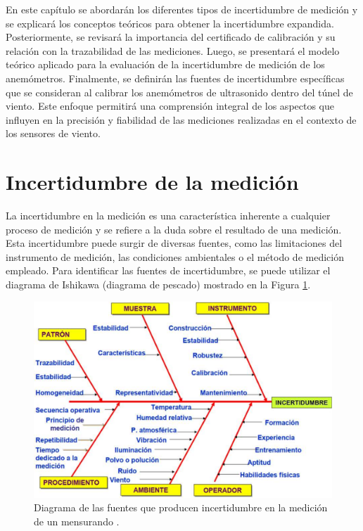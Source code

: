 En este capítulo se abordarán los diferentes tipos de incertidumbre de medición y se explicará los conceptos teóricos para obtener la incertidumbre expandida. Posteriormente, se revisará la importancia del certificado de calibración y su relación con la trazabilidad de las mediciones. Luego, se presentará el modelo teórico aplicado para la evaluación de la incertidumbre de medición de los anemómetros. Finalmente, se definirán las fuentes de incertidumbre específicas que se consideran al calibrar los anemómetros de ultrasonido dentro del túnel de viento.  Este enfoque permitirá una comprensión integral de los aspectos que influyen en la precisión y fiabilidad de las mediciones realizadas en el contexto de los sensores de viento.

\section{Incertidumbre de la medición}\label{sec:tipos_incertidumbre}

La incertidumbre en la medición es una característica inherente a cualquier proceso de medición y se refiere a la duda sobre el resultado de una medición. Esta incertidumbre puede surgir de diversas fuentes, como las limitaciones del instrumento de medición, las condiciones ambientales o el método de medición empleado. Para identificar las fuentes de incertidumbre, se puede utilizar el diagrama de Ishikawa (diagrama de pescado) mostrado en la Figura \ref{fig:diagramaPescado}.

\begin{figure}[H]
    \centering
    \includegraphics[width=0.8\linewidth]{Figuras/calculoIncertidumbre/diagramaPescado.png}
    \caption{Diagrama de las fuentes que producen incertidumbre en la medición de un mensurando \cite{instrumentosMedicionesFiuba}.}
    \label{fig:diagramaPescado}
\end{figure}

